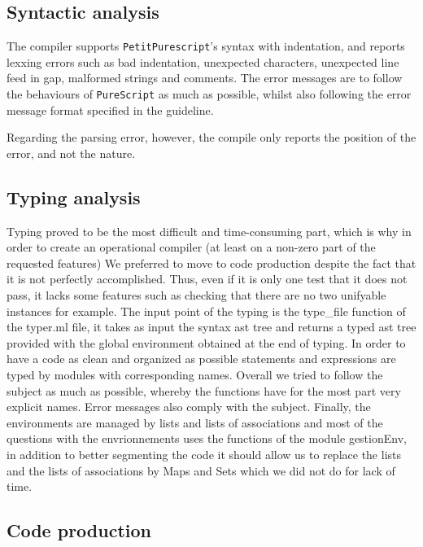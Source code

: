 \documentclass{amsart}
\begin{document}
	\subsection{Syntactic analysis}
	
	The compiler supports \texttt{PetitPurescript}'s syntax with indentation, and reports lexxing errors such as bad indentation, unexpected characters, unexpected line feed in gap, malformed strings and comments. The error messages are to follow the behaviours of \texttt{PureScript} as much as possible, whilst also following the error message format specified in the guideline.
	
	Regarding the parsing error, however, the compile only reports the position of the error, and not the nature.
	
	\subsection{Typing analysis}
	Typing proved to be the most difficult and time-consuming part, which is why in order to create an operational compiler (at least on a non-zero part of the requested features) We preferred to move to code production despite the fact that it is not perfectly accomplished. Thus, even if it is only one test that it does not pass, it lacks some features such as checking that there are no two unifyable instances for example. The input point of the typing is the type\_file function of the typer.ml file, it takes as input the syntax ast tree and returns a typed ast tree provided with the global environment obtained at the end of typing. In order to have a code as clean and organized as possible statements and expressions are typed by modules with corresponding names. Overall we tried to follow the subject as much as possible, whereby the functions have for the most part very explicit names. Error messages also comply with the subject. Finally, the environments are managed by lists and lists of associations and most of the questions with the envrionnements uses the functions of the module gestionEnv, in addition to better segmenting the code it should allow us to replace the lists and the lists of associations by Maps and Sets which we did not do for lack of time.	
	
	\subsection{Code production}
\end{document}
